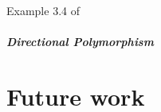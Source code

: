 \documentclass[11pt]{iuthesis}
\begin{document}
Example 3.4 of~\cite{kanellakis1989polymorphic}

\paragraph{Directional Polymorphism}

%





\chapter{Future work}



\printbibliography


\newpage

\end{document}
